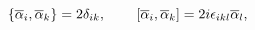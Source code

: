 \begin{equation}
\left\{ \overline{\alpha } _i,\overline{\alpha } _k\right\}
=2\delta _{ik} ,\hspace{0.3in} \left[ \overline{\alpha }
_i,\overline{\alpha } _k\right] =2i\epsilon _{ikl}\overline{\alpha
} _l ,\label{29}
\end{equation}

